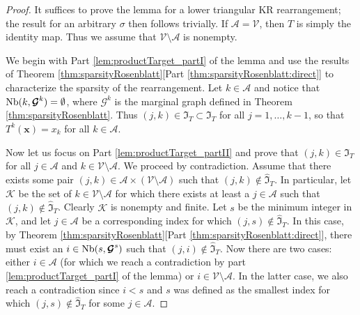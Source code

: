 \documentclass[twoside,11pt]{article}
\newcommand{\Vc}{\mathcal{V}}
\newcommand{\Ac}{\mathcal{A}}
\newcommand{\xb}{\boldsymbol{x}}
\newcommand{\Gcb}{\boldsymbol{\mathcal{G}}}
\newcommand{\Kcb}{\boldsymbol{\mathcal{K}}}
\newcommand{\sparse}{ \mathfrak{I} }
\newcommand{\neigh}{ {\rm Nb} }
\newcommand{\Aset}{ \Ac }
\begin{document}
\begin{proof}
It suffices to prove the lemma for a lower
triangular KR rearrangement; the result for an arbitrary $\sigma$ then follows
trivially.
%
If $\Ac = \Vc$, then $T$ is simply the identity map.
%
Thus we assume that
$\Vc \setminus \Ac$ is nonempty.

We begin with Part \ref{lem:productTarget_partI} of the lemma and use the results
of Theorem \ref{thm:sparsityRosenblatt}[Part \ref{thm:sparsityRosenblatt:direct}] 
to characterize the
sparsity of the rearrangement.
Let $k \in \Aset$ and notice that $\neigh(k,\Gcb^k)=\emptyset$, where 
$\Gcb^k$ is the marginal graph defined in Theorem \ref{thm:sparsityRosenblatt}.
Thus $(j,k)\in \widehat{\sparse}_T \subset \sparse_T$ for all $j=1,\ldots,k-1$,
so that $T^k(\xb)=x_k$ for all $k \in \Aset$.


Now let us focus on Part \ref{lem:productTarget_partII} and  prove that
$(j,k)\in \widehat{\sparse}_T$  for all $j\in \Ac$ and $k \in \Vc \setminus \Ac$.
We proceed by contradiction. 
Assume that there exists some pair $(j,k)\in \Ac \times (\Vc \setminus \Ac)$
such that $(j,k)\notin  \widehat{\sparse}_T$.
In particular, let $\Kcb$ be the set of $k \in \Vc \setminus \Ac$ for which
there exists at least a $j\in \Ac$ such that
$(j,k)\notin \widehat{\sparse}_T$.
Clearly $\Kcb$ is nonempty and finite.
Let $s$ be the minimum integer in $\Kcb$, and let 
$j\in \Aset$ be a corresponding index for which $(j,s)\notin \widehat{\sparse}_T$.
In this case, by Theorem \ref{thm:sparsityRosenblatt}[Part \ref{thm:sparsityRosenblatt:direct}], 
there must exist an 
$i\in \neigh(s , \Gcb^s)$ such that $(j,i) \notin \widehat{\sparse}_T$.
Now there are two cases: either $i \in \Aset$ (for which we reach a
contradiction by part \ref{lem:productTarget_partI} of the lemma) or
$i \in \Vc \setminus \Aset$.
In the latter case, we also reach a contradiction since $i<s$ and $s$ was defined
as the smallest index for which $(j,s) \notin \widehat{\sparse}_T$ for some $j\in \Aset$.
%
%
%
%
%
%
%
%
%
%
%
%
%
%
%
%
%
%
%
%
%
%
%
%
%
%
%
%
\end{proof}
\end{document}

